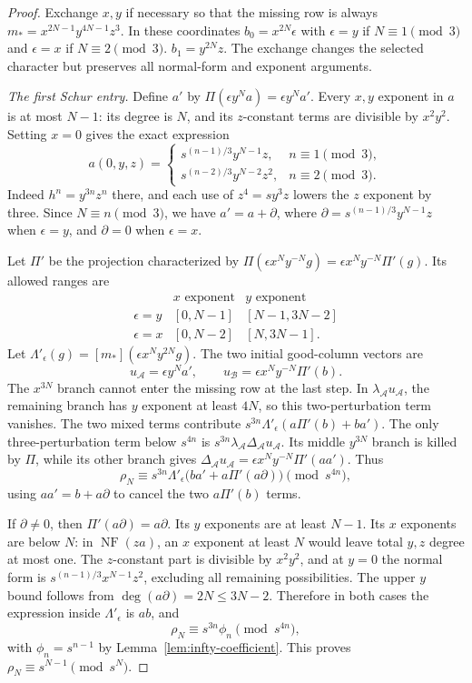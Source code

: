 \documentclass[11pt,a4paper,reqno]{amsart}
\numberwithin{equation}{section}
\theoremstyle{plain}
\theoremstyle{definition}
\theoremstyle{remark}
\DeclareMathOperator{\NF}{NF}
\begin{document}
\begin{proof}
Exchange $x,y$ if necessary so that the missing row is always
$m_*=x^{2N-1}y^{4N-1}z^3$. In these coordinates $b_0=x^{2N}\epsilon$ with $\epsilon=y$ if $N\equiv1\pmod3$ and $\epsilon=x$ if $N\equiv2\pmod3$. $b_1=y^{2N}z$. The exchange changes the selected character but preserves all normal-form and exponent arguments.

\emph{The first Schur entry.}
Define $a'$ by $\Pi(\epsilon y^Na)=\epsilon y^Na'$. Every $x,y$ exponent in $a$ is at most $N-1$: its degree is $N$, and its $z$-constant terms are divisible by $x^2y^2$. Setting $x=0$ gives the exact expression
\[
a(0,y,z)=\begin{cases}
s^{(n-1)/3}y^{N-1}z,&n\equiv1\pmod3,\\
s^{(n-2)/3}y^{N-2}z^2,&n\equiv2\pmod3.
\end{cases}
\]
Indeed $h^n=y^{3n}z^n$ there, and each use of $z^4=sy^3z$ lowers the $z$ exponent by three. Since $N\equiv n\pmod3$, we have $a'=a+\partial$, where
$\partial=s^{(n-1)/3}y^{N-1}z$ when $\epsilon=y$, and $\partial=0$ when $\epsilon=x$.

Let $\Pi'$ be the projection characterized by
$\Pi(\epsilon x^Ny^{-N}g)=\epsilon x^Ny^{-N}\Pi'(g)$. Its allowed ranges are
\[
\begin{array}{c|cc}
&x\text{ exponent}&y\text{ exponent}\\\hline
\epsilon=y&[0,N-1]&[N-1,3N-2]\\
\epsilon=x&[0,N-2]&[N,3N-1].
\end{array}
\]
Let $\Lambda'_\epsilon(g)=[m_*](\epsilon x^Ny^{2N}g)$. The two initial good-column vectors are
\[
u_{\mathcal A}=\epsilon y^Na',\qquad
u_{\mathcal B}=\epsilon x^Ny^{-N}\Pi'(b).
\]
The $x^{3N}$ branch cannot enter the missing row at the last step. In $\lambda_{\mathcal A}u_{\mathcal A}$, the remaining branch has $y$ exponent at least $4N$, so this two-perturbation term vanishes. The two mixed terms contribute
$s^{3n}\Lambda'_\epsilon(a\Pi'(b)+ba')$.
The only three-perturbation term below $s^{4n}$ is
$s^{3n}\lambda_{\mathcal A}\Delta_{\mathcal A}u_{\mathcal A}$. Its middle $y^{3N}$ branch is killed by $\Pi$, while its other branch gives
$\Delta_{\mathcal A}u_{\mathcal A}=\epsilon x^Ny^{-N}\Pi'(aa')$.
Thus
\[
\rho_N\equiv s^{3n}\Lambda'_\epsilon\bigl(ba'+a\Pi'(a\partial)\bigr)\pmod{s^{4n}},
\]
using $aa'=b+a\partial$ to cancel the two $a\Pi'(b)$ terms.

If $\partial\ne0$, then $\Pi'(a\partial)=a\partial$. Its $y$ exponents are at least $N-1$. Its $x$ exponents are below $N$: in $\NF(za)$, an $x$ exponent at least $N$ would leave total $y,z$ degree at most one. The $z$-constant part is divisible by $x^2y^2$, and at $y=0$ the normal form is $s^{(n-1)/3}x^{N-1}z^2$, excluding all remaining possibilities. The upper $y$ bound follows from $\deg(a\partial)=2N\leq3N-2$. Therefore in both cases the expression inside $\Lambda'_\epsilon$ is $ab$, and
\[
\rho_N\equiv s^{3n}\phi_n\pmod{s^{4n}},
\]
with $\phi_n=s^{n-1}$ by Lemma~\ref{lem:infty-coefficient}. This proves $\rho_N\equiv s^{N-1}\pmod{s^N}$.


\end{proof}
\end{document}
